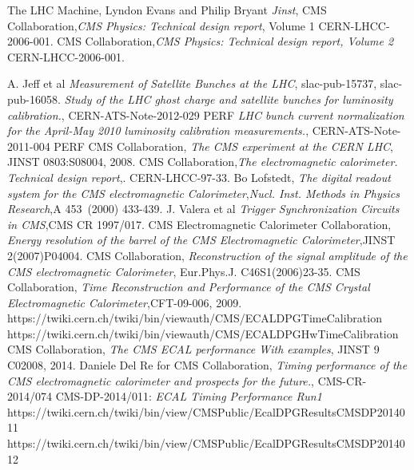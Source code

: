 \begin{thebibliography}{9}
 The LHC Machine, Lyndon Evans and Philip Bryant \textit{Jinst},
CMS Collaboration,\textit{CMS Physics: Technical design report}, Volume 1 CERN-LHCC-2006-001.
CMS Collaboration,\textit{CMS Physics: Technical design report, Volume 2} CERN-LHCC-2006-001.

 A. Jeff et al \textit{Measurement of Satellite Bunches at the LHC}, slac-pub-15737, slac-pub-16058.
 \textit{Study of the LHC ghost charge and
satellite bunches for luminosity calibration.}, CERN-ATS-Note-2012-029 PERF
 \textit{LHC bunch current normalization for the April-May 2010 luminosity calibration measurements.}, CERN-ATS-Note-2011-004 PERF
CMS Collaboration, \textit{The CMS experiment at the CERN LHC}, JINST 0803:S08004, 2008.
CMS Collaboration,\textit{The electromagnetic calorimeter. Technical design report},. CERN-LHCC-97-33.
 Bo Lofstedt, \textit{The digital readout system for the CMS electromagnetic Calorimeter},\textit{Nucl. Inst.  Methods in Physics Research},A 453~(2000) 433-439.
 J. Valera et al \textit{Trigger Synchronization Circuits in CMS},CMS CR 1997/017.
CMS Electromagnetic Calorimeter Collaboration, \textit{Energy resolution of the barrel of the CMS Electromagnetic Calorimeter},JINST 2(2007)P04004.
CMS Collaboration, \textit{Reconstruction of the signal amplitude of the CMS electromagnetic Calorimeter}, Eur.Phys.J. C46S1(2006)23-35.
CMS Collaboration, \textit{Time Reconstruction and Performance of the CMS Crystal Electromagnetic Calorimeter},CFT-09-006, 2009.
 https://twiki.cern.ch/twiki/bin/viewauth/CMS/ECALDPGTimeCalibration
https://twiki.cern.ch/twiki/bin/viewauth/CMS/ECALDPGHwTimeCalibration
CMS Collaboration, \textit{The CMS ECAL performance With examples}, JINST 9 C02008, 2014.
 Daniele Del Re for CMS Collaboration, \textit{Timing performance of the CMS electromagnetic calorimeter and prospects for the future.}, CMS-CR-2014/074
 CMS-DP-2014/011: \textit{ECAL Timing Performance Run1}
 https://twiki.cern.ch/twiki/bin/view/CMSPublic/EcalDPGResultsCMSDP2014011
https://twiki.cern.ch/twiki/bin/view/CMSPublic/EcalDPGResultsCMSDP2014012


\end{thebibliography}
